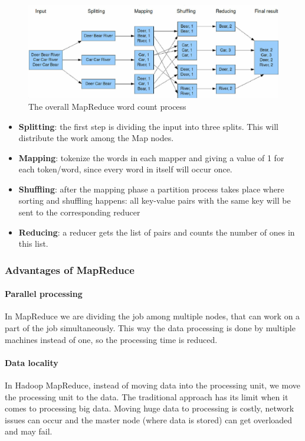 \begin{figure}[H]
	\includegraphics[width=150mm, keepaspectratio]{figures/MapReduce_Example.png}
	\caption*{The overall MapReduce word count process}
	\centering
\end{figure}
\begin{itemize}
	\item \textbf{Splitting}: the first step is dividing the input into three splits. This will distribute the work among the Map nodes.
	\item \textbf{Mapping}: tokenize the words in each mapper and giving a value of 1 for each token/word, since every word in itself will occur once.
	\item \textbf{Shuffling}: after the mapping phase a partition process takes place where sorting and shuffling happens: all key-value pairs with the same key will be sent to the corresponding reducer
	\item \textbf{Reducing}: a reducer gets the list of pairs and counts the number of ones in this list.
\end{itemize}

\subsubsection*{Advantages of MapReduce}
\paragraph{Parallel processing}
In MapReduce we are dividing the job among multiple nodes, that can work on a part of the job simultaneously. This way the data processing is done by multiple machines instead of one, so the processing time is reduced.
\paragraph{Data locality}
In Hadoop MapReduce, instead of moving data into the processing unit, we move the processing unit to the data. The traditional approach has its limit when it comes to processing big data. Moving huge data to  processing is costly, network issues can occur and the master node (where data is stored) can get overloaded and may fail. 

